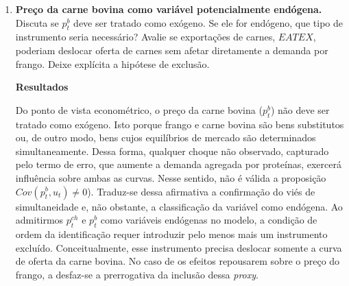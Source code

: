 \documentclass[12pt,a4paper]{article}
\begin{document}
\begin{enumerate}[label=\textbf{\arabic*.}]
A Figura~\ref{fig:iv_curve_actual_data} ajuda a entender por que uma elasticidade estimada com instrumento fraco pode ser enganosa para análise antitruste. O estimador IV pode ser interpretado como uma razão entre a forma reduzida e o primeiro estágio. Quando o primeiro estágio se aproxima de zero, o denominador da razão fica pequeno, tornando a elasticidade-preço estimada extremamente instável. Assim, pequenas variações nos dados ou na força do instrumento podem gerar grandes oscilações em $\hat{\beta}_p$.

Por isso, uma elasticidade estimada com instrumento fraco pode levar a conclusões equivocadas. Se o instrumento fraco gerar uma elasticidade artificialmente baixa em módulo, a autoridade antitruste pode superestimar o poder de mercado das firmas. Por outro lado, se o instrumento fraco gerar uma elasticidade excessivamente alta em módulo, pode-se subestimar esse poder de mercado. Em ambos os casos, decisões sobre margens, perda crítica, fusões ou condutas podem se tornar pouco confiáveis.

Portanto, a elasticidade-preço estimada deve ser interpretada em conjunto com os diagnósticos de força e validade dos instrumentos. Para fins de análise antitruste, não basta observar se $|\hat{\beta}_p|$ é maior ou menor que 1; é necessário avaliar se a estimativa está bem identificada, se os instrumentos são suficientemente fortes e se a hipótese de exclusão é economicamente plausível.

\item \textbf{Preço da carne bovina como variável potencialmente endógena.}
    Discuta se $p_t^b$ deve ser tratado como exógeno. Se ele for endógeno, que tipo
    de instrumento seria necessário? Avalie se exportações de carnes, $EATEX$,
    poderiam deslocar oferta de carnes sem afetar diretamente a demanda por frango.
    Deixe explícita a hipótese de exclusão.

\textbf{Resultados}

Do ponto de vista econométrico, o preço da carne bovina ($p_t^b$) não deve ser tratado como exógeno. Isto porque frango e carne bovina são bens substitutos ou, de outro modo, bens cujos equilíbrios de mercado são determinados simultaneamente. Dessa forma, qualquer choque não observado, capturado pelo termo de erro, que aumente a demanda agregada por proteínas, exercerá influência sobre ambas as curvas. Nesse sentido, não é válida a proposição $Cov(p_t^b , u_t) \neq 0$). Traduz-se dessa afirmativa a confirmação do viés de simultaneidade e, não obstante, a classificação da variável como endógena. Ao admitirmos $p_t^{ch}$ e $p_t^b$ como variáveis endógenas no modelo, a condição de ordem da identificação requer introduzir pelo menos mais um instrumento excluído. Conceitualmente, esse instrumento precisa deslocar somente a curva de oferta da carne bovina. No caso de os efeitos repousarem sobre o preço do frango, a desfaz-se a prerrogativa da inclusão dessa \textit{proxy}. 


\end{enumerate}
\end{document}
